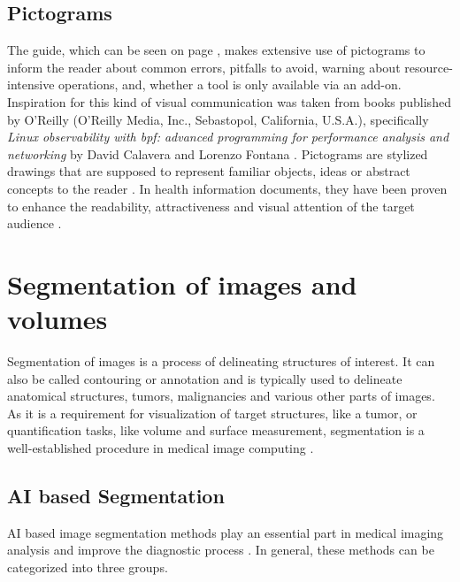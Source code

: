 \subsection{Pictograms}\label{s:b-pictograms}
The guide, which can be seen on page \pageref{a:guide}, makes extensive use of pictograms to inform the reader about common errors,
pitfalls to avoid, warning about resource-intensive operations, and, whether a tool is only available via an add-on.
Inspiration for this kind of visual communication was taken from books published by O'Reilly (O'Reilly Media, Inc., Sebastopol, California, U.S.A.), specifically \textit{Linux observability with \acrshort{bpf}: advanced programming for performance analysis and networking} by David Calavera and Lorenzo Fontana \cite{calaveraLinuxObservabilityBPF2019}.
Pictograms are stylized drawings that are supposed to represent familiar objects, ideas or abstract concepts to the reader \cite{dowsePharmacistsAreWords2021}.
In health information documents, they have been proven to enhance the readability, attractiveness and visual attention of the target audience \cite{houtsRolePicturesImproving2006,mansoorEffectPictogramsReadability2003}.\\


\pagebreak
\section{Segmentation of images and volumes}\label{s:b-segmentation-basics}
Segmentation of images is a process of delineating structures of interest.
It can also be called contouring or annotation and is typically used to delineate anatomical structures, tumors,
malignancies and various other parts of images.
As it is a requirement for visualization of target structures, like a tumor, or quantification tasks, like volume and surface measurement,
segmentation is a well-established procedure in medical image computing \cite{pinterPolymorphSegmentationRepresentation2019,slicercommunity3DSlicerImage2022}.

\subsection{AI based Segmentation}\label{s:b-seg-ai}
AI based image segmentation methods play an essential part in medical imaging analysis and improve the diagnostic process \cite{qureshiMedicalImageSegmentation2023}.
In general, these methods can be categorized into three groups.

